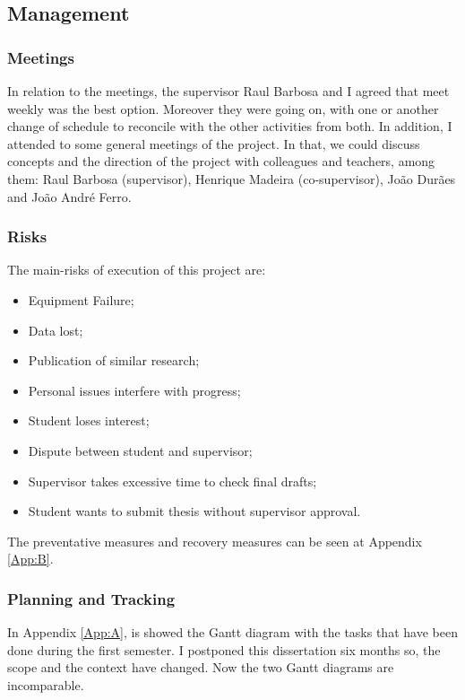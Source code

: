 \subsection{Management}


\subsubsection{Meetings}
In relation to the meetings, the supervisor Raul Barbosa and I agreed that meet weekly was the best option. Moreover they were going on, with one or another change of schedule to reconcile with the other activities from both. In addition, I attended to some general meetings of the project. In that, we could discuss concepts and the direction of the project with colleagues and teachers, among them: Raul Barbosa (supervisor), Henrique Madeira (co-supervisor), João Durães and João André Ferro.

\subsubsection{Risks}

The main-risks of execution of this project are:


\begin{itemize}
	\item Equipment Failure;
	\item Data lost;
	\item Publication of similar research;
	\item Personal issues interfere with progress;
	\item Student loses interest;
	\item Dispute between student and supervisor;
	\item Supervisor takes excessive time to check final drafts;
	\item Student wants to submit thesis without supervisor approval.
\end{itemize}


The preventative measures and recovery measures can be seen at Appendix \ref{App:B}.

\subsubsection{Planning and Tracking}
In Appendix \ref{App:A}, is showed the Gantt diagram with the tasks that have been done during the first semester.
I postponed this dissertation six months so, the scope and the context have changed. Now the two Gantt diagrams are incomparable.


